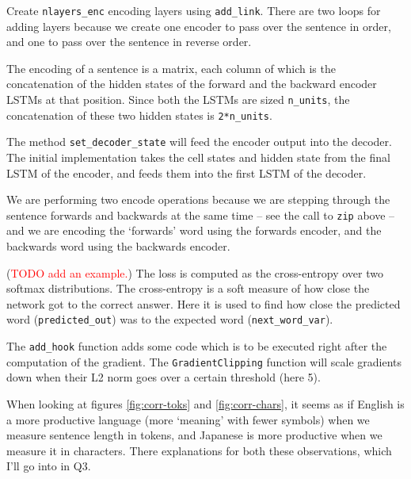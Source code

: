 \documentclass[answers]{exam}
\begin{document}
\begin{CJK}{UTF8}{min}
\begin{questions}

\begin{framed}
\begin{compactenum}[A.]
  \item
    Create \texttt{nlayers\_enc} encoding layers using \texttt{add\_link}. There
    are two loops for adding layers because we create one encoder to pass over
    the sentence in order, and one to pass over the sentence in reverse order.
  \item
    The encoding of a sentence is a matrix, each column of which is the
    concatenation of the hidden states of the forward and the backward encoder
    LSTMs at that position. Since both the LSTMs are sized \texttt{n\_units},
    the concatenation of these two hidden states is \texttt{2*n\_units}.
  \item
    The method \texttt{set\_decoder\_state} will feed the encoder output into
    the decoder. The initial implementation takes the cell states and hidden
    state from the final LSTM of the encoder, and feeds them into the first LSTM
    of the decoder.
  \item
    We are performing two encode operations because we are stepping through the
    sentence forwards and backwards at the same time -- see the call to
    \texttt{zip} above -- and we are encoding the `forwards' word using the
    forwards encoder, and the backwards word using the backwards encoder.
  \item
    (\textcolor{red}{TODO add an example.})
    The loss is computed as the cross-entropy over two softmax distributions.
    The cross-entropy is a soft measure of how close the network got to the
    correct answer. Here it is used to find how close the predicted word
    (\texttt{predicted\_out}) was to the expected word
    (\texttt{next\_word\_var}).
  \item
    The \texttt{add\_hook} function adds some code which is to be executed right
    after the computation of the gradient. The \texttt{GradientClipping}
    function will scale gradients down when their L2 norm goes over a certain
    threshold (here 5).
\end{compactenum}
\end{framed}


\begin{framed}
\begin{compactenum}[1.]
  \item
    When looking at figures \ref{fig:corr-toks} and \ref{fig:corr-chars}, it
    seems as if English is a more productive language (more `meaning' with fewer
    symbols) when we measure sentence length in tokens, and Japanese is more
    productive when we measure it in characters. There explanations for both
    these observations, which I'll go into in Q3.


\end{compactenum}
\end{framed}
\end{questions}
\end{CJK}
\end{document}
